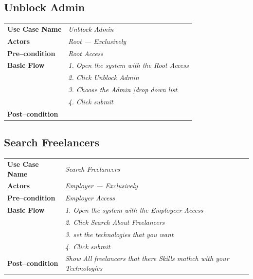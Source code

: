 \documentclass{article}
\begin{document}
\subsection{Unblock Admin}
    \begin{tabular}{ l | l }
    \toprule
      \rowcolor{LightCyan}
      \textbf{Use Case Name}    & \textit{Unblock Admin}\\
      \textbf{Actors}           & \textit{Root --- Exclusively}\\
      \rowcolor{LightCyan}
      \textbf{Pre--condition}   & \textit{Root Access}\\
      \textbf{Basic Flow}       & \textit{1. Open the system with the Root Access}\\
                                & \textit{2. Click Unblock Admin}\\
                                & \textit{3. Choose the Admin [drop down list}\\
                                & \textit{4. Click submit}\\
      \rowcolor{LightCyan}
      \textbf{Post--condition}  & \textit{}\\
    \toprule
    \end{tabular}


\newpage

\subsection{Search Freelancers}
    \begin{tabular}{ l | l }
    \toprule
      \rowcolor{LightCyan}
      \textbf{Use Case Name}    & \textit{Search Freelancers}\\
      \textbf{Actors}           & \textit{Employer --- Exclusively}\\
      \rowcolor{LightCyan}
      \textbf{Pre--condition}   & \textit{Employer Access}\\
      \textbf{Basic Flow}       & \textit{1. Open the system with the Employeer Access}\\
                                & \textit{2. Click Search About Freelancers}\\
                                & \textit{3. set the technologies that you want}\\
                                & \textit{4. Click submit}\\
      \rowcolor{LightCyan}
      \textbf{Post--condition}  & \textit{Show All freelancers that there Skills mathch with your Technologies}\\
    \toprule
    \end{tabular}
\end{document}
